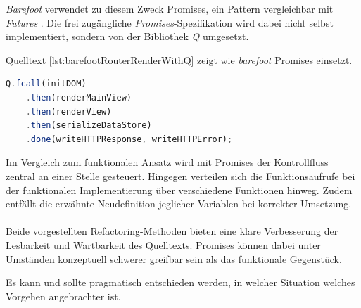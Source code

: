 \emph{Barefoot} verwendet zu diesem Zweck Promises, ein Pattern vergleichbar mit \emph{Futures} \cite{FuturesAndPromises}. Die frei zugängliche \emph{Promises}-Spezifikation \cite{PromisesAPlusSpec} wird dabei nicht selbst implementiert, sondern von der Bibliothek \emph{Q} \cite{QLibrary} umgesetzt.

Quelltext \ref{lst:barefootRouterRenderWithQ} zeigt wie \emph{barefoot} Promises einsetzt.

\begin{lstlisting}[language=JavaScript, firstnumber=215, caption={Ausschnitt aus server/router-mixin.js \cite{barefootRouterRenderWithQ}}, label={lst:barefootRouterRenderWithQ}]
	Q.fcall(initDOM)
	.then(renderMainView)
	.then(renderView)
	.then(serializeDataStore)
	.done(writeHTTPResponse, writeHTTPError);
\end{lstlisting}

Im Vergleich zum funktionalen Ansatz wird mit Promises der Kontrollfluss zentral an einer Stelle gesteuert. Hingegen verteilen sich die Funktionsaufrufe  bei der funktionalen Implementierung über verschiedene Funktionen hinweg. Zudem entfällt die erwähnte Neudefinition jeglicher Variablen bei korrekter Umsetzung.
\\ \\
Beide vorgestellten Refactoring-Methoden bieten eine klare Verbesserung der Lesbarkeit und Wartbarkeit des Quelltexts. Promises können dabei unter Umständen konzeptuell schwerer greifbar sein als das funktionale Gegenstück.

Es kann und sollte pragmatisch entschieden werden, in welcher Situation welches Vorgehen angebrachter ist.
